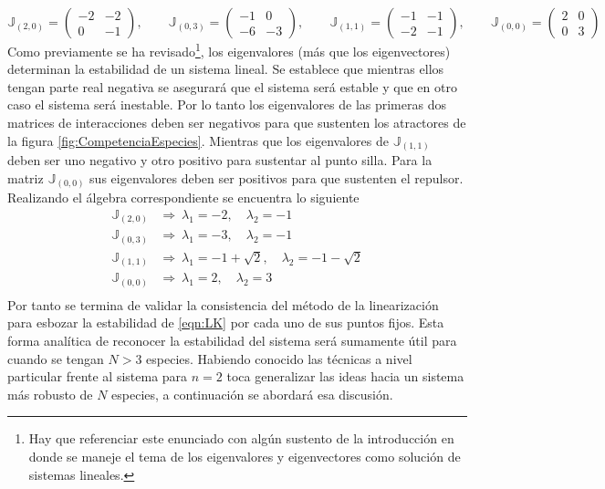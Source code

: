 \documentclass[11pt,a4paper]{article}
\begin{document}
$$
\mathbb{J}_{(2,0)} = \begin{pmatrix}
	-2 & -2\\
	0 & -1
\end{pmatrix},\qquad \mathbb{J}_{(0,3)}=\begin{pmatrix}
-1 & 0\\
-6 & -3
\end{pmatrix},\qquad \mathbb{J}_{(1,1)}=\begin{pmatrix}
-1 & -1\\
-2 & -1
\end{pmatrix},\qquad \mathbb{J}_{(0,0)}=\begin{pmatrix}
2 & 0 \\
0 & 3
\end{pmatrix}
$$
Como previamente se ha revisado\footnote{Hay que referenciar este enunciado con algún sustento de la introducción en donde se maneje el tema de los eigenvalores y eigenvectores como solución de sistemas lineales.}, los eigenvalores (más que los eigenvectores) determinan la estabilidad de un sistema lineal. Se establece que mientras ellos tengan parte real negativa se asegurará que el sistema será estable y que en otro caso el sistema será inestable. Por lo tanto los eigenvalores de las primeras dos matrices de interacciones deben ser negativos para que sustenten los atractores de la figura \ref{fig:CompetenciaEspecies}. Mientras que los eigenvalores de $\mathbb{J}_{(1,1)}$ deben ser uno negativo y otro positivo para sustentar al punto silla. Para la matriz $\mathbb{J}_{(0,0)}$ sus eigenvalores deben ser positivos para que sustenten el repulsor. Realizando el álgebra correspondiente se encuentra lo siguiente
\begin{align*}
	\mathbb{J}_{(2,0)}&\Longrightarrow\ \lambda_1 = -2,\quad\lambda_2 = -1\\
	\mathbb{J}_{(0,3)}&\Longrightarrow\ \lambda_1 = -3,\quad\lambda_2 = -1\\
	\mathbb{J}_{(1,1)}&\Longrightarrow\ \lambda_1 = -1+\sqrt{2},\quad\lambda_2 = -1-\sqrt{2}\\
	\mathbb{J}_{(0,0)}&\Longrightarrow\ \lambda_1 = 2,\quad\lambda_2 = 3\\
\end{align*}
Por tanto se termina de validar la consistencia del método de la linearización para esbozar la estabilidad de \ref{eqn:LK} por cada uno de sus puntos fijos. Esta forma analítica de reconocer la estabilidad del sistema será sumamente útil para cuando se tengan $N>3$ especies. Habiendo conocido las técnicas a nivel particular frente al sistema para $n=2$ toca generalizar las ideas hacia un sistema más robusto de $N$ especies, a continuación se abordará esa discusión.
\end{document}
